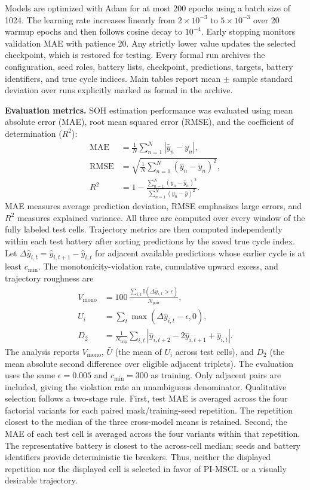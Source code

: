 \documentclass[pdflatex,sn-mathphys-num]{sn-jnl}
\begin{document}
Models are optimized with Adam for at most 200 epochs using a batch size of 1024. The learning rate increases linearly from $2\times10^{-3}$ to $5\times10^{-3}$ over 20 warmup epochs and then follows cosine decay to $10^{-4}$. Early stopping monitors validation MAE with patience 20. Any strictly lower value updates the selected checkpoint, which is restored for testing. Every formal run archives the configuration, seed roles, battery lists, checkpoint, predictions, targets, battery identifiers, and true cycle indices. Main tables report mean $\pm$ sample standard deviation over runs explicitly marked as formal in the archive.

\noindent\textbf{Evaluation metrics.}
SOH estimation performance was evaluated using mean absolute error (MAE), root mean squared error (RMSE), and the coefficient of determination ($R^2$):
\begin{align}
\mathrm{MAE} &= \frac{1}{N}\sum_{n=1}^{N}\left|\hat{y}_{n}-y_{n}\right|, \\
\mathrm{RMSE} &= \sqrt{\frac{1}{N}\sum_{n=1}^{N}\left(\hat{y}_{n}-y_{n}\right)^2}, \\
R^2 &= 1-\frac{\sum_{n=1}^{N}\left(y_n-\hat{y}_n\right)^2}{\sum_{n=1}^{N}\left(y_n-\bar{y}\right)^2}.
\end{align}
MAE measures average prediction deviation, RMSE emphasizes large errors, and $R^2$ measures explained variance. All three are computed over every window of the fully labeled test cells. Trajectory metrics are then computed independently within each test battery after sorting predictions by the saved true cycle index. Let $\Delta\hat{y}_{i,t}=\hat{y}_{i,t+1}-\hat{y}_{i,t}$ for adjacent available predictions whose earlier cycle is at least $c_{\min}$. The monotonicity-violation rate, cumulative upward excess, and trajectory roughness are
\begin{align}
V_{\mathrm{mono}} &= 100\,\frac{\sum_{i,t}\mathbb{I}\!\left(\Delta\hat{y}_{i,t}>\epsilon\right)}{N_{\mathrm{pair}}},\\
U_i &= \sum_t \max\left(\Delta\hat{y}_{i,t}-\epsilon,0\right),\\
D_2 &= \frac{1}{N_{\mathrm{trip}}}\sum_{i,t}\left|\hat{y}_{i,t+2}-2\hat{y}_{i,t+1}+\hat{y}_{i,t}\right|.
\end{align}
The analysis reports $V_{\mathrm{mono}}$, $\bar{U}$ (the mean of $U_i$ across test cells), and $D_2$ (the mean absolute second difference over eligible adjacent triplets). The evaluation uses the same $\epsilon=0.005$ and $c_{\min}=300$ as training. Only adjacent pairs are included, giving the violation rate an unambiguous denominator. Qualitative selection follows a two-stage rule. First, test MAE is averaged across the four factorial variants for each paired mask/training-seed repetition. The repetition closest to the median of the three cross-model means is retained. Second, the MAE of each test cell is averaged across the four variants within that repetition. The representative battery is closest to the across-cell median; seeds and battery identifiers provide deterministic tie breakers. Thus, neither the displayed repetition nor the displayed cell is selected in favor of PI-MSCL or a visually desirable trajectory.
\end{document}
